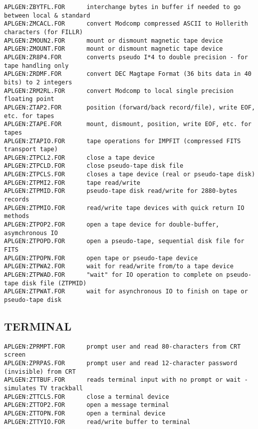 \begin{verbatim}
APLGEN:ZBYTFL.FOR      interchange bytes in buffer if needed to go between local & standard
APLGEN:ZMCACL.FOR      convert Modcomp compressed ASCII to Hollerith characters (for FILLR)
APLGEN:ZMOUN2.FOR      mount or dismount magnetic tape device
APLGEN:ZMOUNT.FOR      mount or dismount magnetic tape device
APLGEN:ZR8P4.FOR       converts pseudo I*4 to double precision - for tape handling only
APLGEN:ZRDMF.FOR       convert DEC Magtape Format (36 bits data in 40 bits) to 2 integers
APLGEN:ZRM2RL.FOR      convert Modcomp to local single precision floating point
APLGEN:ZTAP2.FOR       position (forward/back record/file), write EOF, etc. for tapes
APLGEN:ZTAPE.FOR       mount, dismount, position, write EOF, etc. for tapes
APLGEN:ZTAPIO.FOR      tape operations for IMPFIT (compressed FITS transport tape)
APLGEN:ZTPCL2.FOR      close a tape device
APLGEN:ZTPCLD.FOR      close pseudo-tape disk file
APLGEN:ZTPCLS.FOR      closes a tape device (real or pseudo-tape disk)
APLGEN:ZTPMI2.FOR      tape read/write
APLGEN:ZTPMID.FOR      pseudo-tape disk read/write for 2880-bytes records
APLGEN:ZTPMIO.FOR      read/write tape devices with quick return IO methods
APLGEN:ZTPOP2.FOR      open a tape device for double-buffer, asymchronous IO
APLGEN:ZTPOPD.FOR      open a pseudo-tape, sequential disk file for FITS
APLGEN:ZTPOPN.FOR      open tape or pseudo-tape device
APLGEN:ZTPWA2.FOR      wait for read/write from/to a tape device
APLGEN:ZTPWAD.FOR      "wait" for IO operation to complete on pseudo-tape disk file (ZTPMID)
APLGEN:ZTPWAT.FOR      wait for asynchronous IO to finish on tape or pseudo-tape disk
\end{verbatim}
 
\subsection{TERMINAL}
\begin{verbatim}
APLGEN:ZPRMPT.FOR      prompt user and read 80-characters from CRT screen
APLGEN:ZPRPAS.FOR      prompt user and read 12-character password (invisible) from CRT
APLGEN:ZTTBUF.FOR      reads terminal input with no prompt or wait - simulates TV trackball
APLGEN:ZTTCLS.FOR      close a terminal device
APLGEN:ZTTOP2.FOR      open a message terminal
APLGEN:ZTTOPN.FOR      open a terminal device
APLGEN:ZTTYIO.FOR      read/write buffer to terminal
\end{verbatim}
 
